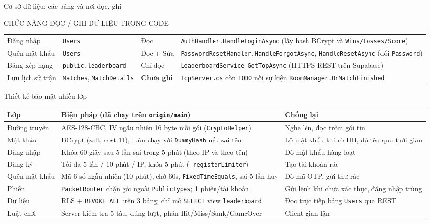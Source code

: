 \documentclass[aspectratio=169,9pt]{beamer}
\begin{document}
\begin{frame}[t,label=db_tables]{Cơ sở dữ liệu: các bảng và nơi đọc, ghi}
\begin{khung}{CHỨC NĂNG ĐỌC / GHI DỮ LIỆU TRONG CODE}
\begin{tabularx}{\linewidth}{@{}l l l Y@{}}
      Đăng nhập & \texttt{Users} & Đọc & \texttt{AuthHandler.HandleLoginAsync} (lấy hash BCrypt và \texttt{Wins/Losses/Score}) \\
      Quên mật khẩu & \texttt{Users} & Đọc + Sửa & \texttt{PasswordResetHandler.HandleForgotAsync}, \texttt{HandleResetAsync} (đổi \texttt{Password}) \\
      Bảng xếp hạng & \texttt{public.leaderboard} & Chỉ đọc & \texttt{LeaderboardService.GetTopAsync} (HTTPS REST trên Supabase) \\
      Lưu lịch sử trận & \texttt{Matches}, \texttt{MatchDetails} & \textbf{Chưa ghi} & \texttt{TcpServer.cs} còn \texttt{TODO} nối sự kiện \texttt{RoomManager.OnMatchFinished} \\
      \bottomrule
    \end{tabularx}
  \end{khung}
\end{frame}

\begin{frame}[t,label=bm]{Thiết kế bảo mật nhiều lớp}
  \footnotesize
  \begin{tabularx}{\textwidth}{@{}l Y Y@{}}
    \toprule \textbf{Lớp} & \textbf{Biện pháp (đã chạy trên \texttt{origin/main})} & \textbf{Chống lại} \\ \midrule
    Đường truyền & AES-128-CBC, IV ngẫu nhiên 16 byte mỗi gói (\texttt{CryptoHelper}) & Nghe lén, đọc trộm gói tin \\
    Mật khẩu & BCrypt (salt, cost 11), luôn chạy với \texttt{DummyHash} nếu sai tên & Lộ mật khẩu khi rò DB, dò tên qua thời gian \\
    Đăng nhập & Khóa 60 giây sau 5 lần sai trong 5 phút (theo IP và theo tên) & Dò mật khẩu hàng loạt \\
    Đăng ký & Tối đa 5 lần / 10 phút / IP, khóa 5 phút (\texttt{\_registerLimiter}) & Tạo tài khoản rác \\
    Quên mật khẩu & Mã 6 số ngẫu nhiên (10 phút), chờ 60s, \texttt{FixedTimeEquals}, sai 5 lần hủy & Dò mã OTP, gửi thư rác \\
    Phiên & \texttt{PacketRouter} chặn gói ngoài \texttt{PublicTypes}; 1 phiên/tài khoản & Gửi lệnh khi chưa xác thực, đăng nhập trùng \\
    Dữ liệu & RLS + \texttt{REVOKE ALL} trên 3 bảng; chỉ mở \texttt{SELECT} view \texttt{leaderboard} & Đọc trực tiếp bảng \texttt{Users} qua REST \\
    Luật chơi & Server kiểm tra 5 tàu, đúng lượt, phán Hit/Miss/Sunk/GameOver & Client gian lận \\
    \bottomrule
  \end{tabularx}
\end{frame}
\end{document}
